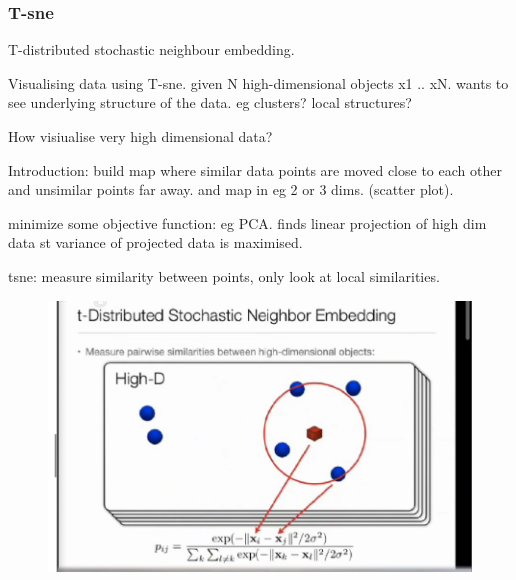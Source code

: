 	
	
	\subsubsection{T-sne}
	T-distributed stochastic neighbour embedding.
	
	
	Visualising data using T-sne.
	given N high-dimensional objects x1 .. xN. wants to see underlying structure of the data. eg clusters? local structures?
	
	How visiualise very high dimensional data?
	
	Introduction:
		build map where similar data points are moved close to each other and unsimilar points far away. and map in eg 2 or 3 dims. (scatter plot).
		
		minimize some objective function:
			eg PCA. finds linear projection of high dim data st variance of projected data is maximised.
	
	tsne:
		measure similarity between points, only look at local similarities.
		\begin{figure}[h]
			\centering
			\includegraphics[width=0.7\linewidth]{"tsne gaus"}
			\caption{}
			\label{fig:tsne-gaus}
		\end{figure}
		
